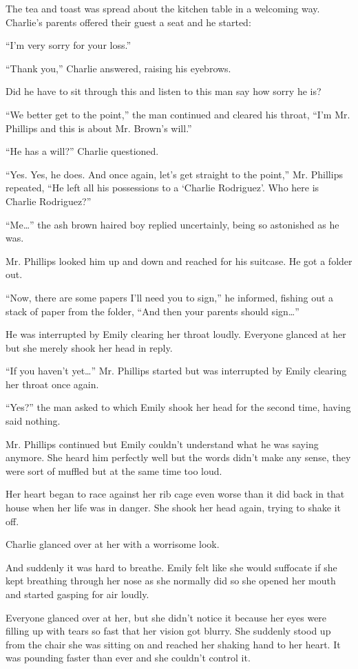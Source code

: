 The tea and toast was spread about the kitchen table in a welcoming way. Charlie's parents offered their guest a seat and he started:

“I'm very sorry for your loss.”

“Thank you,” Charlie answered, raising his eyebrows.

Did he have to sit through this and listen to this man say how sorry he is?

“We better get to the point,” the man continued and cleared his throat, “I'm Mr. Phillips and this is about Mr. Brown's will.”

“He has a will?” Charlie questioned.

“Yes. Yes, he does. And once again, let's get straight to the point,” Mr. Phillips repeated, “He left all his possessions to a ‘Charlie Rodriguez'. Who here is Charlie Rodriguez?”

“Me…” the ash brown haired boy replied uncertainly, being so astonished as he was.

Mr. Phillips looked him up and down and reached for his suitcase. He got a folder out.

“Now, there are some papers I'll need you to sign,” he informed, fishing out a stack of paper from the folder, “And then your parents should sign…”

He was interrupted by Emily clearing her throat loudly. Everyone glanced at her but she merely shook her head in reply.

“If you haven't yet…” Mr. Phillips started but was interrupted by Emily clearing her throat once again.

“Yes?” the man asked to which Emily shook her head for the second time, having said nothing.

Mr. Phillips continued but Emily couldn't understand what he was saying anymore. She heard him perfectly well but the words didn't make any sense, they were sort of muffled but at the same time too loud.

Her heart began to race against her rib cage even worse than it did back in that house when her life was in danger. She shook her head again, trying to shake it off.

Charlie glanced over at her with a worrisome look.

And suddenly it was hard to breathe. Emily felt like she would suffocate if she kept breathing through her nose as she normally did so she opened her mouth and started gasping for air loudly.

Everyone glanced over at her, but she didn't notice it because her eyes were filling up with tears so fast that her vision got blurry. She suddenly stood up from the chair she was sitting on and reached her shaking hand to her heart. It was pounding faster than ever and she couldn't control it.

